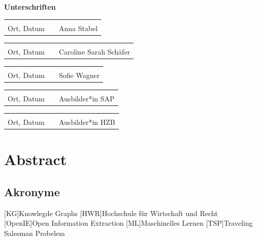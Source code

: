 \documentclass[12pt, oneside]{article}
\newcommand{\studentNameOne}{Anna Stabel}
\newcommand{\studentNameTwo}{Caroline Sarah Schäfer}
\newcommand{\studentNameThree}{Sofie Wagner}
\begin{document}
\newpage
\textbf{Unterschriften}
\newline

\begin{tabular}{lp{4em}l} 
 \hspace{5cm}   && \hspace{4cm} \\\cline{1-1}\cline{3-3} 
Ort, Datum     && \studentNameOne 
\end{tabular}

\begin{tabular}{lp{4em}l} 
 \hspace{5cm}   && \hspace{4cm} \\\cline{1-1}\cline{3-3} 
Ort, Datum     && \studentNameTwo
\end{tabular}

\begin{tabular}{lp{4em}l} 
 \hspace{5cm}   && \hspace{4cm} \\\cline{1-1}\cline{3-3} 
Ort, Datum     && \studentNameThree 
\end{tabular}

\begin{tabular}{lp{4em}l} 
 \hspace{5cm}   && \hspace{4cm} \\\cline{1-1}\cline{3-3} 
Ort, Datum     && Ausbilder*in SAP 
\end{tabular}

\begin{tabular}{lp{4em}l} 
 \hspace{5cm}   && \hspace{4cm} \\\cline{1-1}\cline{3-3} 
Ort, Datum     && Ausbilder*in HZB
\end{tabular}

\newpage

\section*{Abstract}
%
\noindent


\newpage

\tableofcontents
\newpage

\begin{acronym}[ECU]
\section*{Akronyme}

    [KG]{Knowlegde Graphs}
    [HWR]{Hochschule für Wirtschaft und Recht}
    [OpenIE]{Open Information Extraction}
    [ML]{Maschinelles Lernen}
    [TSP]{Traveling Salesman Probelem}

\end{acronym}
\end{document}

